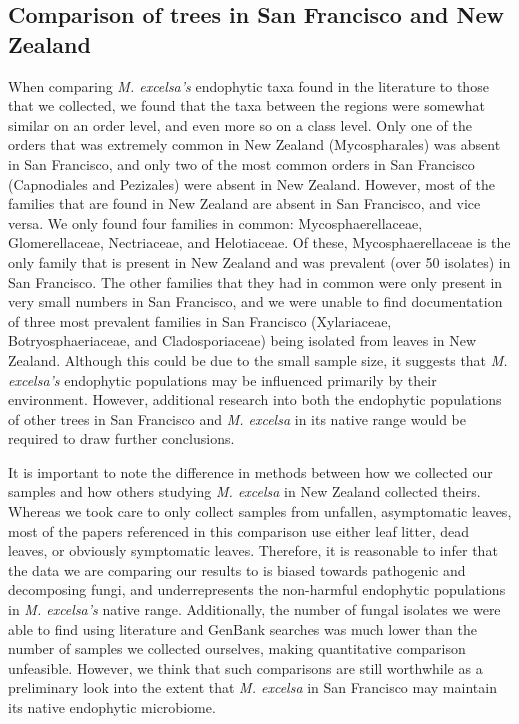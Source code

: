 \documentclass[fleqn,10pt,lineno]{wlpeerj} %
\begin{document}
\hypertarget{comparison-of-trees-in-san-francisco-and-new-zealand}{%
\subsection*{Comparison of trees in San Francisco and New Zealand}\label{comparison-of-trees-in-san-francisco-and-new-zealand}}

When comparing \emph{M. excelsa's} endophytic taxa found in the literature to those that we collected, we found that the taxa between the regions were somewhat similar on an order level, and even more so on a class level. Only one of the orders that was extremely common in New Zealand (Mycospharales) was absent in San Francisco, and only two of the most common orders in San Francisco (Capnodiales and Pezizales) were absent in New Zealand. However, most of the families that are found in New Zealand are absent in San Francisco, and vice versa. We only found four families in common: Mycosphaerellaceae, Glomerellaceae, Nectriaceae, and Helotiaceae. Of these, Mycosphaerellaceae is the only family that is present in New Zealand and was prevalent (over 50 isolates) in San Francisco. The other families that they had in common were only present in very small numbers in San Francisco, and we were unable to find documentation of three most prevalent families in San Francisco (Xylariaceae, Botryosphaeriaceae, and Cladosporiaceae) being isolated from leaves in New Zealand. Although this could be due to the small sample size, it suggests that \emph{M. excelsa's} endophytic populations may be influenced primarily by their environment. However, additional research into both the endophytic populations of other trees in San Francisco and \emph{M. excelsa} in its native range would be required to draw further conclusions.

It is important to note the difference in methods between how we collected our samples and how others studying \emph{M. excelsa} in New Zealand collected theirs. Whereas we took care to only collect samples from unfallen, asymptomatic leaves, most of the papers referenced in this comparison use either leaf litter, dead leaves, or obviously symptomatic leaves. Therefore, it is reasonable to infer that the data we are comparing our results to is biased towards pathogenic and decomposing fungi, and underrepresents the non-harmful endophytic populations in \emph{M. excelsa's} native range. Additionally, the number of fungal isolates we were able to find using literature and GenBank searches was much lower than the number of samples we collected ourselves, making quantitative comparison unfeasible. However, we think that such comparisons are still worthwhile as a preliminary look into the extent that \emph{M. excelsa} in San Francisco may maintain its native endophytic microbiome.
\end{document}
